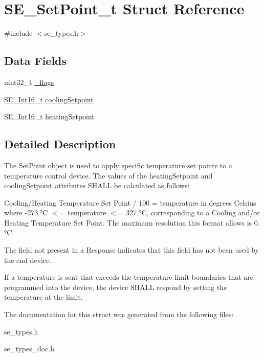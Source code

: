 \hypertarget{structSE__SetPoint__t}{}\section{S\+E\+\_\+\+Set\+Point\+\_\+t Struct Reference}
\label{structSE__SetPoint__t}


{\ttfamily \#include $<$se\+\_\+types.\+h$>$}

\subsection*{Data Fields}
\begin{DoxyCompactItemize}
\item 
uint32\+\_\+t \hyperlink{group__SetPoint_ga360f6a67726d6468bd638a32b65a0a1d}{\+\_\+flags}
\item 
\hyperlink{group__Int16_ga0d600c7df811a7d4b4816e8965877690}{S\+E\+\_\+\+Int16\+\_\+t} \hyperlink{group__SetPoint_gadc4572d576c1de2dd7de8357024e4029}{cooling\+Setpoint}
\item 
\hyperlink{group__Int16_ga0d600c7df811a7d4b4816e8965877690}{S\+E\+\_\+\+Int16\+\_\+t} \hyperlink{group__SetPoint_ga961578027f149085d46eb9fd1ddb4956}{heating\+Setpoint}
\end{DoxyCompactItemize}


\subsection{Detailed Description}
The Set\+Point object is used to apply specific temperature set points to a temperature control device. The values of the heating\+Setpoint and cooling\+Setpoint attributes S\+H\+A\+LL be calculated as follows\+:

Cooling/\+Heating Temperature Set Point / 100 = temperature in degrees Celsius where -\/273.°C $<$= temperature $<$= 327.°C, corresponding to a Cooling and/or Heating Temperature Set Point. The maximum resolution this format allows is 0.°C.

The field not present in a Response indicates that this field has not been used by the end device.

If a temperature is sent that exceeds the temperature limit boundaries that are programmed into the device, the device S\+H\+A\+LL respond by setting the temperature at the limit. 

The documentation for this struct was generated from the following files\+:\begin{DoxyCompactItemize}
\item 
se\+\_\+types.\+h\item 
se\+\_\+types\+\_\+doc.\+h\end{DoxyCompactItemize}
